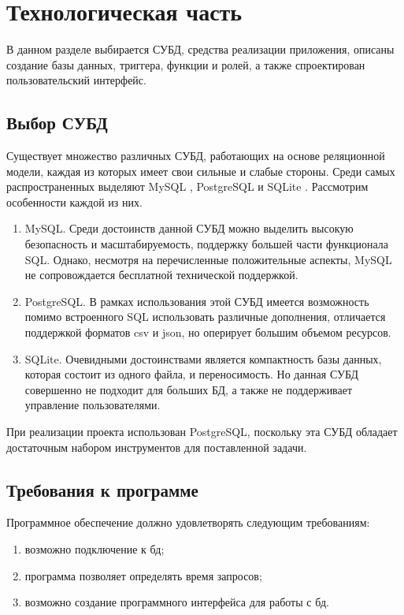 \section{Технологическая часть}

В данном разделе выбирается СУБД, средства реализации приложения,
описаны создание базы данных, триггера, функции и ролей,
а также спроектирован пользовательский интерфейс.

\subsection{Выбор СУБД}

Существует множество различных СУБД, работающих на основе реляционной модели,
каждая из которых имеет свои сильные и слабые стороны.
Среди самых распространенных \cite{most_popular} выделяют MySQL \cite{mysql},
PostgreSQL \cite{postgresql} и SQLite \cite{sqlite}.
Рассмотрим особенности каждой из них.

\begin{enumerate}[label=\arabic*.]
    \item MySQL. Среди достоинств данной СУБД можно выделить высокую
          безопасность и масштабируемость,
          поддержку большей части функционала SQL. Однако, несмотря на
          перечисленные
          положительные аспекты,
          MySQL не сопровождается бесплатной технической поддержкой.
    \item PostgreSQL. В рамках использования этой СУБД имеется возможность
          помимо встроенного SQL использовать различные дополнения,
          отличается поддержкой форматов csv и json, но оперирует большим
          объемом
          ресурсов.
    \item SQLite. Очевидными достоинствами является компактность базы
          данных, которая состоит из одного файла,
          и переносимость.
          Но данная СУБД совершенно не подходит для больших БД, а также не
          поддерживает управление пользователями.
\end{enumerate}

При реализации проекта использован PostgreSQL,
поскольку эта СУБД обладает достаточным набором инструментов для поставленной
задачи.
\subsection{Требования к программе}

Программное обеспечение должно удовлетворять следующим требованиям:
\begin{enumerate}[label=\arabic*.]
    \item возможно подключение к бд;
    \item программа позволяет определять время запросов;
    \item возможно создание программного интерфейса для работы с бд.
\end{enumerate}

